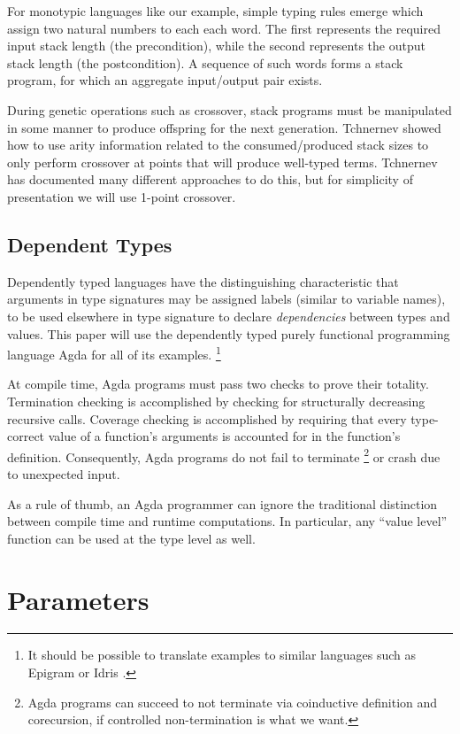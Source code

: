 \documentclass[runningheads,a4paper]{llncs}
\begin{document}
For monotypic languages like our example, simple typing rules
emerge which assign two natural numbers to each each word. The first represents the
required input stack length (the precondition), while the second represents
the output stack length (the postcondition). A sequence of such words forms a stack
program, for which an aggregate input/output pair exists.

During genetic operations such as crossover, stack programs must be
manipulated in some manner to produce offspring for the next
generation. Tchnernev \cite{tchernev:forthcross} showed how to use arity
information related to the consumed/produced stack sizes to only
perform crossover at points that will produce well-typed
terms. Tchnernev \cite{tchernev:crossmethods} has documented many different
approaches to do this, but for simplicity of presentation we will use
1-point crossover.

\subsection{Dependent Types}

Dependently typed languages have the distinguishing characteristic
that arguments in type signatures may be assigned labels (similar to
variable names), to be used elsewhere in type signature to declare
\textit{dependencies} between types and values. This paper will use the
dependently typed purely functional programming language Agda \cite{norell:agdatut} for
all of its examples. \footnote{It should be possible to translate examples
to similar languages such as Epigram \cite{mcbride:epigram} or
Idris \cite{brady:idris}.}

At compile time, Agda programs must pass two checks to prove their
totality. Termination checking is accomplished by checking
for structurally decreasing recursive calls. Coverage checking is
accomplished by requiring that every type-correct value of a function's
arguments is accounted for in the function's definition.
Consequently, Agda programs do not fail to terminate
\footnote{Agda programs can succeed to not terminate via
  coinductive definition and corecursion, if controlled
  non-termination is what we want.}
or crash due to unexpected input.

As a rule of thumb, an Agda programmer can ignore the traditional
distinction between compile time and runtime computations. In
particular, any ``value level'' function can be used at the type level
as well.

\section{Parameters}
\end{document}
